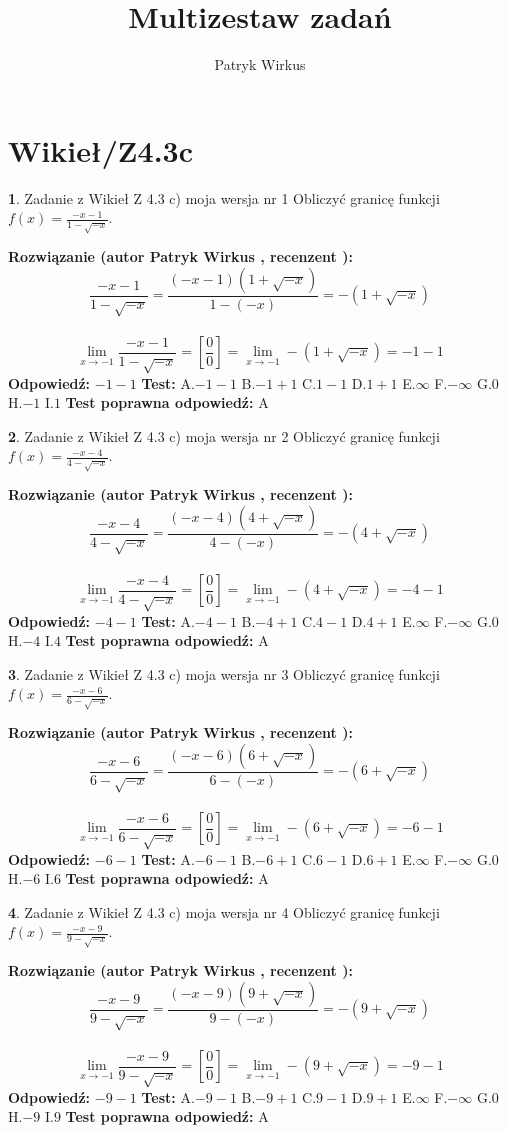 \documentclass[12pt, a4paper]{article}
\title{Multizestaw zadań}
\author{Patryk Wirkus}
\date{}
\theoremstyle{definition} %
\newtheorem{zad}{}
\newcommand{\kategoria}[1]{\section{#1}}
\newcommand{\zadStart}[1]{\begin{zad}#1\newline}
\newcommand{\zadStop}{\end{zad}}
\newcommand{\rozwStart}[2]{\noindent \textbf{Rozwiązanie (autor #1 , recenzent #2): }\newline}
\newcommand{\rozwStop}{\newline}
\newcommand{\odpStart}{\noindent \textbf{Odpowiedź:}\newline}
\newcommand{\odpStop}{\newline}
\newcommand{\testStart}{\noindent \textbf{Test:}\newline}
\newcommand{\testStop}{\newline}
\newcommand{\kluczStart}{\noindent \textbf{Test poprawna odpowiedź:}\newline}
\newcommand{\kluczStop}{\newline}
\begin{document}
\maketitle

\kategoria{Wikieł/Z4.3c}


\zadStart{Zadanie z Wikieł Z 4.3 c) moja wersja nr 1}
Obliczyć granicę funkcji $f(x)=\frac{-x-1}{1-\sqrt{-x}}$.
\zadStop
\rozwStart{Patryk Wirkus}{}
$$\frac{-x-1}{1-\sqrt{-x}}=\frac{(-x-1)(1+\sqrt{-x})}{1-(-x)}=-(1+\sqrt{-x})$$
\\
$$\lim\limits_{x\to-1}\frac{-x-1}{1-\sqrt{-x}}=[\frac{0}{0}]=\lim\limits_{x\to-1}-(1+\sqrt{-x}) =-1-1$$
\rozwStop
\odpStart
$-1-1$
\odpStop
\testStart
A.$-1-1$
B.$-1+1$
C.$1-1$
D.$1+1$
E.$\infty$
F.$-\infty$
G.$0$
H.$-1$
I.$1$
\testStop
\kluczStart
A
\kluczStop



\zadStart{Zadanie z Wikieł Z 4.3 c) moja wersja nr 2}
Obliczyć granicę funkcji $f(x)=\frac{-x-4}{4-\sqrt{-x}}$.
\zadStop
\rozwStart{Patryk Wirkus}{}
$$\frac{-x-4}{4-\sqrt{-x}}=\frac{(-x-4)(4+\sqrt{-x})}{4-(-x)}=-(4+\sqrt{-x})$$
\\
$$\lim\limits_{x\to-1}\frac{-x-4}{4-\sqrt{-x}}=[\frac{0}{0}]=\lim\limits_{x\to-1}-(4+\sqrt{-x}) =-4-1$$
\rozwStop
\odpStart
$-4-1$
\odpStop
\testStart
A.$-4-1$
B.$-4+1$
C.$4-1$
D.$4+1$
E.$\infty$
F.$-\infty$
G.$0$
H.$-4$
I.$4$
\testStop
\kluczStart
A
\kluczStop



\zadStart{Zadanie z Wikieł Z 4.3 c) moja wersja nr 3}
Obliczyć granicę funkcji $f(x)=\frac{-x-6}{6-\sqrt{-x}}$.
\zadStop
\rozwStart{Patryk Wirkus}{}
$$\frac{-x-6}{6-\sqrt{-x}}=\frac{(-x-6)(6+\sqrt{-x})}{6-(-x)}=-(6+\sqrt{-x})$$
\\
$$\lim\limits_{x\to-1}\frac{-x-6}{6-\sqrt{-x}}=[\frac{0}{0}]=\lim\limits_{x\to-1}-(6+\sqrt{-x}) =-6-1$$
\rozwStop
\odpStart
$-6-1$
\odpStop
\testStart
A.$-6-1$
B.$-6+1$
C.$6-1$
D.$6+1$
E.$\infty$
F.$-\infty$
G.$0$
H.$-6$
I.$6$
\testStop
\kluczStart
A
\kluczStop



\zadStart{Zadanie z Wikieł Z 4.3 c) moja wersja nr 4}
Obliczyć granicę funkcji $f(x)=\frac{-x-9}{9-\sqrt{-x}}$.
\zadStop
\rozwStart{Patryk Wirkus}{}
$$\frac{-x-9}{9-\sqrt{-x}}=\frac{(-x-9)(9+\sqrt{-x})}{9-(-x)}=-(9+\sqrt{-x})$$
\\
$$\lim\limits_{x\to-1}\frac{-x-9}{9-\sqrt{-x}}=[\frac{0}{0}]=\lim\limits_{x\to-1}-(9+\sqrt{-x}) =-9-1$$
\rozwStop
\odpStart
$-9-1$
\odpStop
\testStart
A.$-9-1$
B.$-9+1$
C.$9-1$
D.$9+1$
E.$\infty$
F.$-\infty$
G.$0$
H.$-9$
I.$9$
\testStop
\kluczStart
A
\kluczStop
\end{document}
